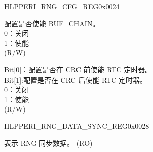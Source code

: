 
\begin{register}{H}{LPPERI\_RNG\_CFG\_REG}{0x0024}\label{regdesc:LPPERIRNGCFGREG}
%
%
%
%
%
\regnewline%
\begin{regdesc}\begin{reglist}
\label{fielddesc:LPPERIRNGSAMPLEENABLE}\item [LPPERI\_RNG\_SAMPLE\_ENABLE] 配置是否使能 BUF\_CHAIN。\\0：关闭\\ 1：使能\\  (R/W)
\label{fielddesc:LPPERIRTCTIMEREN}\item [LPPERI\_RTC\_TIMER\_EN]
Bit[0]：配置是否在 CRC 前使能 RTC 定时器。\\
Bit[1]:配置是否在 CRC 后使能 RTC 定时器。\\
0：关闭\\ 1：使能\\ (R/W)
\end{reglist}\end{regdesc}
\end{register}


\begin{register}{H}{LPPERI\_RNG\_DATA\_SYNC\_REG}{0x0028}\label{regdesc:LPPERIRNGSYNCDATAREG}
%
\regnewline%
\begin{regdesc}\begin{reglist}
\label{fielddesc:LPPERIRNGSYNCDATA}\item [LPPERI\_RNG\_SYNC\_DATA] 表示 RNG 同步数据。 (RO)
\end{reglist}\end{regdesc}
\end{register}